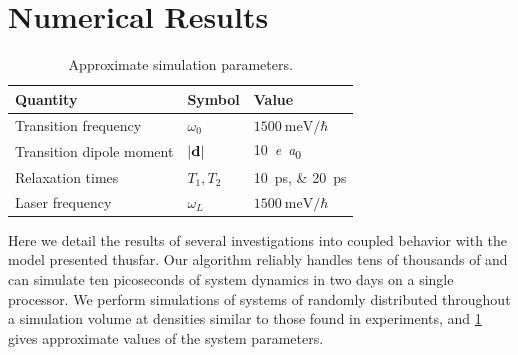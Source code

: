 \section{Numerical Results}
\begin{table}
  \begin{ruledtabular}
    \begin{tabular}{lll}
      Quantity                 & Symbol         & Value                        \\ \hline
      Transition frequency     & $\omega_0$     & $\SI{1500}{\milli\eV}/\hbar$ \\
      Transition dipole moment & $\abs{\vb{d}}$ & \SI{10}{\elementarycharge\bohr} \\
      Relaxation times         & $T_{1}, T_{2}$ & \SIlist{10;20}{\pico\second} \\
      Laser frequency          & $\omega_L$     & $\SI{1500}{\milli\eV}/\hbar$ \\
    \end{tabular}
  \end{ruledtabular}
  \caption{\label{table:parameters}Approximate simulation parameters.}
\end{table}

Here we detail the results of several investigations into coupled \qd{} behavior with the model presented thusfar.
Our algorithm reliably handles tens of thousands of \qds{} and can simulate ten picoseconds of system dynamics in two days on a single processor.
We perform simulations of systems of \qds{} randomly distributed throughout a simulation volume at densities similar to those found in experiments, and \cref{table:parameters} gives approximate values of the system parameters.


